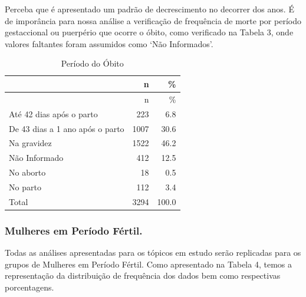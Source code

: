 \documentclass[
]{article}
\begin{document}
Perceba que é apresentado um padrão de decrescimento no decorrer dos
anos. É de imporância para nossa análise a verificação de frequência de
morte por período gestaccional ou puerpério que ocorre o óbito, como
verificado na Tabela 3, onde valores faltantes foram assumidos como `Não
Informados'.

\begin{longtable}[]{@{}lrr@{}}
\caption{Período do Óbito}\tabularnewline
\toprule\noalign{}
& n & \% \\
\midrule\noalign{}
\endfirsthead
\toprule\noalign{}
& n & \% \\
\midrule\noalign{}
\endhead
\bottomrule\noalign{}
\endlastfoot
Até 42 dias após o parto & 223 & 6.8 \\
De 43 dias a 1 ano após o parto & 1007 & 30.6 \\
Na gravidez & 1522 & 46.2 \\
Não Informado & 412 & 12.5 \\
No aborto & 18 & 0.5 \\
No parto & 112 & 3.4 \\
Total & 3294 & 100.0 \\
\end{longtable}

\hypertarget{mulheres-em-peruxedodo-fuxe9rtil.}{%
\subsubsection{Mulheres em Período
Fértil.}\label{mulheres-em-peruxedodo-fuxe9rtil.}}

Todas as análises apresentadas para os tópicos em estudo serão
replicadas para os grupos de Mulheres em Período Fértil. Como
apresentado na Tabela 4, temos a representação da distribuição de
frequência dos dados bem como respectivas porcentagens.
\end{document}
